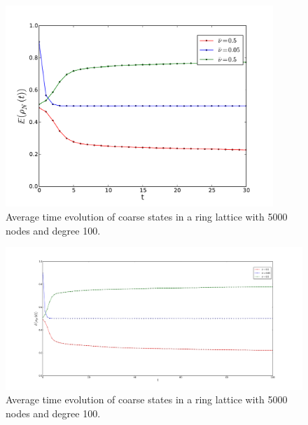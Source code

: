\documentclass[]{article}
\begin{document}
\begin{figure}
\includegraphics[width=0.9\textwidth]{time_evolution_ring_M1000_N4000.pdf}
\caption{Average time evolution of coarse states in a ring lattice with  5000 nodes and degree 100.}
\label{fig:time_evolution_ring}
\end{figure}


\begin{figure}
\includegraphics[width=1.3\textwidth]{time_evolution_ring_M1000_N4000_100steps.pdf}
\caption{Average time evolution of coarse states in a ring lattice with  5000 nodes and degree 100.}
\label{fig:time_evolution_ring_long}
\end{figure}



\newpage{}




\end{document}
